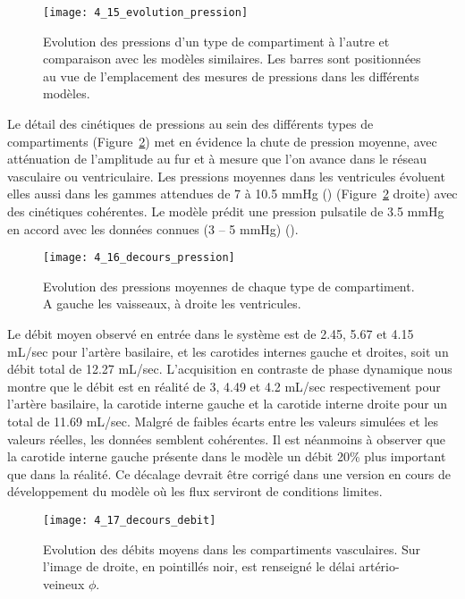 \begin{figure}[!t]
\centering
\texttt{[image: 4\_15\_evolution\_pression]}
\caption{Evolution des pressions d'un type de compartiment à l'autre et comparaison avec les modèles similaires. Les
barres sont positionnées au vue de l’emplacement des mesures de pressions dans les différents modèles.}
\label{fig:4_15_evolution_pression}	
\end{figure}
Le détail des cinétiques de pressions au sein des différents types de compartiments (Figure~\ref{fig:4_16_decours_pression})
met en évidence la chute de pression moyenne, avec atténuation de l’amplitude au fur et à mesure
que l’on avance dans le réseau vasculaire ou ventriculaire. Les pressions moyennes dans les ventricules
évoluent elles aussi dans les gammes attendues de 7 à 10.5 mmHg (\cite{Agamanolis2011}) (Figure~\ref{fig:4_16_decours_pression} droite) avec des
cinétiques cohérentes. Le modèle prédit une pression pulsatile de 3.5 mmHg en accord avec les
données connues (3 – 5 mmHg) (\cite{Czosnyka2005}).

\begin{figure}[!b]
\centering
\texttt{[image: 4\_16\_decours\_pression]}
\caption{Evolution des pressions moyennes de chaque type de compartiment. A gauche les vaisseaux, à droite les
ventricules.}
\label{fig:4_16_decours_pression}	
\end{figure}
Le débit moyen observé en entrée dans le système est de 2.45, 5.67 et 4.15 mL/sec pour
l’artère basilaire, et les carotides internes gauche et droites, soit un débit total de 12.27 mL/sec.
L’acquisition en contraste de phase dynamique nous montre que le débit est en réalité de 3, 4.49 et
4.2 mL/sec respectivement pour l’artère basilaire, la carotide interne gauche et la carotide interne
droite pour un total de 11.69 mL/sec. Malgré de faibles écarts entre les valeurs simulées et les valeurs
réelles, les données semblent cohérentes. Il est néanmoins à observer que la carotide interne gauche
présente dans le modèle un débit 20\% plus important que dans la réalité. Ce décalage devrait être
corrigé dans une version en cours de développement du modèle où les flux serviront de conditions
limites.

\begin{figure}[!t]
\centering
\texttt{[image: 4\_17\_decours\_debit]}
\caption{Evolution des débits moyens dans les compartiments vasculaires. Sur l’image de droite, en pointillés noir, est
renseigné le délai artério-veineux $\phi$.}
\label{fig:4_17_decours_debit}	
\end{figure}

